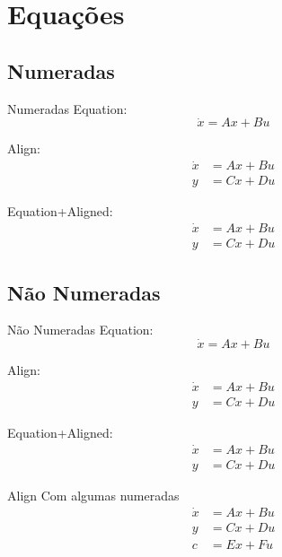 
\section{Equações}
\subsection{Numeradas}

\begin{slide}{Numeradas}
  Equation:
  \begin{equation}
    \dot{x} = Ax+Bu
  \end{equation}

  \vspace*{\fill} %

  Align:
  \begin{align}
    \dot{x} & = Ax+Bu \\
    y       & =Cx+Du
  \end{align}

  \vspace*{\fill}

  Equation+Aligned:
  \begin{equation}
    \begin{aligned}
      \dot{x} & = Ax+Bu \\
      y       & =Cx+Du
    \end{aligned}
  \end{equation}
\end{slide}

\subsection{Não Numeradas}

\begin{slide}{Não Numeradas}
  Equation:
  \begin{equation*}
    \dot{x} = Ax+Bu
  \end{equation*}

  \vspace*{\fill} %

  Align:
  \begin{align*}
    \dot{x} & = Ax+Bu \\
    y       & =Cx+Du
  \end{align*}

  \vspace*{\fill}

  Equation+Aligned:
  \begin{equation*}
    \begin{aligned}
      \dot{x} & = Ax+Bu \\
      y       & =Cx+Du
    \end{aligned}
  \end{equation*}
\end{slide}

\begin{slide}{Align Com algumas numeradas}
  \begin{align}
    \dot{x} & = Ax+Bu           \\
    y       & = Cx+Du           \\
    c       & = Ex+Fu \nonumber %
  \end{align}
\end{slide}
